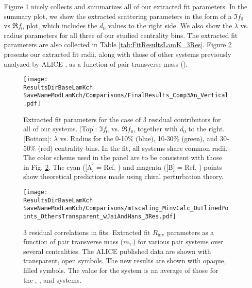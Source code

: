 \documentclass[/home/jesse/Analysis/FemtoAnalysis/AnalysisNotes/AnalysisNoteJBuxton.tex]{subfiles}
\renewcommand{\NonFlatBgdLamKch}{_NonFlatBgdCrctnLamK0LinearLamKchPolynomial}
\renewcommand{\ResNum}{_3Res}
\renewcommand{\PrimMaxDecay}{_PrimMaxDecay10fm}
\renewcommand{\SaveNameModLamKch}{\MomRes\NonFlatBgdLamKch\ResNum\PrimMaxDecay\ResMethod\ParamFixAndShareLamKch}
\begin{document}
Figure \ref{fig:ScattParams_3Res} nicely collects and summarizes all of our extracted fit parameters.
In the summary plot, we show the extracted scattering parameters in the form of a $\Im f_{0}$ vs $\Re f_{0}$ plot, which includes the $d_{0}$ values to the right side.  
We also show the $\lambda$ vs. radius parameters for all three of our studied centrality bins.  
The extracted fit parameters are also collected in Table \ref{tab:FitResultsLamK_3Res}.
Figure \ref{fig:mTScalingOfRadii_3Res} presents our extracted fit radii, along with those of other systems previously analyzed by ALICE \cite{Adam:2015vja}, as a function of pair transverse mass (\mt).

\begin{comment}
\begin{landscape}

\end{landscape}
\end{comment}




\begin{figure}[h]
  \centering
  \texttt{[image: \\ResultsDirBaseLamKch\\SaveNameModLamKch/Comparisons/FinalResults\_Comp3An\_Vertical.pdf]}
  \caption[Extracted scattering parameters]
  {
  Extracted fit parameters for the case of 3 residual contributors for all of our \LamK systems.  
  [Top]: $\Im f_{0}$ vs. $\Re f_{0}$, together with $d_{0}$ to the right.  
  [Bottom]: $\lambda$ vs. Radius for the 0-10\% (blue), 10-30\% (green), and 30-50\% (red) centrality bins.  
  In the fit, all \LamK systems share common radii.
  The color scheme used in the panel are to be consistent with those in Fig. \ref{fig:mTScalingOfRadii_3Res}.
  The cyan ([A] = Ref. \cite{Liu:2006xja}) and magenta ([B] = Ref. \cite{Mai:2009ce}) points show theoretical predictions made using chiral perturbation theory.
  }
  \label{fig:ScattParams_3Res}
\end{figure}

\begin{figure}[h]
  \centering
  \texttt{[image: \\ResultsDirBaseLamKch\\SaveNameModLamKch/Comparisons/mTscaling\_MinvCalc\_OutlinedPoints\_OthersTransparent\_wJaiAndHans\_3Res.pdf]}
  \caption[$m_{\mathrm{T}}$ scaling of radii]
  {
  3 residual correlations in \LamK fits.  
  Extracted fit $R_{\mathrm{inv}}$ parameters as a function of pair transverse mass ($m_{\mathrm{T}}$) for various pair systems over several centralities. 
  The ALICE published data \cite{Adam:2015vja} are shown with transparent, open symbols.  
  The new \LamK results are shown with opaque, filled symbols.  
  The \mt value for the \LamK system is an average of those for the \LamKchP, \ALamKchM, and \LamKs systems.
  }
  \label{fig:mTScalingOfRadii_3Res}
\end{figure}


\clearpage



\end{document}
